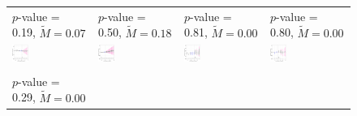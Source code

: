 \documentclass[12pt]{article}
\begin{document}
\begin{figure}[!h]
{\begin{tabular}{C{3.8cm}C{3.8cm}C{3.8cm}C{3.8cm}}
   \citet{magaloni2020killing} \newline  $p$-value = 0.19, $\tilde{M} = 0.07$  &
   \citet{Paglayan2022} \newline  $p$-value = 0.50, $\tilde{M} = 0.18$ &  
   \citet{Payson2020jop} \newline  $p$-value = 0.81, $\tilde{M} = 0.00$  &
      \citet{Payson2020apsr} \newline  $p$-value = 0.80, $\tilde{M} = 0.00$ \\
   \hspace{-2em}  \includegraphics[width = 0.22\textwidth]{figure/placebo_honest/magaloni_honest_placebo.png} & 
   \hspace{-2em}  \includegraphics[width = 0.22\textwidth]{figure/placebo_honest/paglayan_honest_placebo.png} &
   \hspace{-2em}  \includegraphics[width = 0.22\textwidth]{figure/placebo_honest/paysonb_honest_placebo.png} &
      \hspace{-2em} \includegraphics[width = 0.22\textwidth]{figure/placebo_honest/paysona_honest_placebo.png} \\ \\
   \citet{Pierskalla2018} \newline $p$-value = 0.29, $\tilde{M} = 0.00$ & 

\end{tabular}}
\end{figure}
\end{document}
